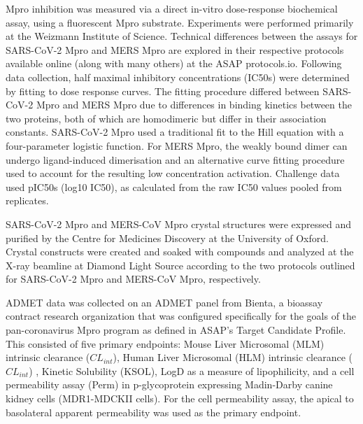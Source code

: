 \documentclass[journal=jcim,manuscript=article]{achemso}
\begin{document}
Mpro inhibition was measured via a direct in-vitro dose-response biochemical assay, using a fluorescent Mpro substrate. Experiments were performed primarily at the Weizmann Institute of Science. Technical differences between the assays for SARS-CoV-2 Mpro\cite{sars_mpro_dose_response_protocol} and MERS Mpro\cite{mers_mpro_dose_response_protocol} are explored in their respective protocols available online (along with many others) at the ASAP protocols.io\cite{asap_protocols_io}. Following data collection, half maximal inhibitory concentrations (IC50s) were determined by fitting to dose response curves. The fitting procedure differed between SARS-CoV-2 Mpro and MERS Mpro due to differences in binding kinetics between the two proteins, both of which are homodimeric but differ in their association constants. SARS-CoV-2 Mpro used a traditional fit to the Hill equation\cite{Hill_eq_1910} with a four-parameter logistic function. For MERS Mpro, the weakly bound dimer can undergo ligand-induced dimerisation and an alternative curve fitting procedure used to account for the resulting low concentration activation. Challenge data used pIC50s (log10 IC50), as calculated from the raw IC50 values pooled from replicates. 

SARS-CoV-2 Mpro and MERS-CoV Mpro crystal structures were expressed and purified by the Centre for Medicines Discovery at the University of Oxford. Crystal constructs were created and soaked with compounds and analyzed at the X-ray beamline at Diamond Light Source according to the two protocols outlined for SARS-CoV-2 Mpro\cite{sars_mpro_crystal_protocol} and MERS-CoV Mpro, respectively\cite{mers_mpro_crystal_protocol}. 

ADMET data was collected on an ADMET panel from Bienta, a bioassay contract research organization that was configured specifically for the goals of the pan-coronavirus Mpro program as defined in ASAP’s Target Candidate Profile\cite{sars_mers_tcp}. This consisted of five primary endpoints: Mouse Liver Microsomal (MLM) intrinsic clearance ($CL_{int}$), Human Liver Microsomal (HLM) intrinsic clearance ($CL_{int}$) \cite{hlm_mlm_assay_protcol}, Kinetic Solubility (KSOL)\cite{ksol_assay_protocol}, LogD as a measure of lipophilicity\cite{logD_assay_protocol}, and a cell permeability assay (Perm) in p-glycoprotein expressing Madin-Darby canine kidney cells (MDR1-MDCKII cells)\cite{perm_assay_protocol}. For the cell permeability assay, the apical to basolateral apparent permeability was used as the primary endpoint.
\end{document}
